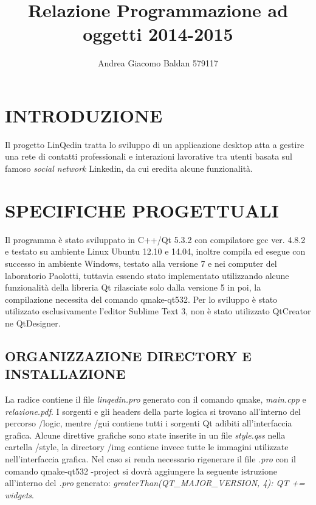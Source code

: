 \documentclass[11pt,a4paper]{article}
\title{Relazione Programmazione ad oggetti 2014-2015}
\author{Andrea Giacomo Baldan 579117}
\begin{document}
\maketitle
\begingroup
\let\clearpage\relax
\section*{INTRODUZIONE}
Il progetto LinQedin tratta lo sviluppo di un applicazione desktop atta a gestire una rete di contatti professionali e interazioni lavorative tra utenti
basata sul famoso \textit{social network} Linkedin\textcopyright, da cui eredita alcune funzionalità.
\section*{SPECIFICHE PROGETTUALI}
Il programma è stato sviluppato in C++/Qt 5.3.2 con compilatore gcc ver. 4.8.2 e testato su ambiente Linux Ubuntu 12.10 e 14.04, inoltre compila ed esegue con successo in ambiente Windows, testato
alla versione 7 e nei computer del laboratorio Paolotti, tuttavia essendo stato implementato utilizzando alcune funzionalità della libreria Qt rilasciate solo dalla versione 5 in poi,
la compilazione necessita del comando qmake-qt532.
Per lo sviluppo è stato utilizzato esclusivamente l'editor Sublime Text 3, non è stato utilizzato QtCreator ne QtDesigner.
\subsection*{ORGANIZZAZIONE DIRECTORY E INSTALLAZIONE}
La radice contiene il file \textit{linqedin.pro} generato con il comando qmake, \textit{main.cpp} e \textit{relazione.pdf}.
I sorgenti e gli headers della parte logica si trovano all'interno del percorso /logic, mentre /gui contiene tutti i sorgenti Qt adibiti all'interfaccia grafica.
Alcune direttive grafiche sono state inserite in un file \textit{style.qss} nella cartella /style, la directory /img contiene invece tutte le immagini utilizzate nell'interfaccia grafica.
Nel caso si renda necessario rigenerare il file \textit{.pro} con il comando qmake-qt532 -project si dovrà aggiungere la seguente istruzione all'interno del \textit{.pro} generato: \textit{greaterThan(QT\_MAJOR\_VERSION, 4): QT += widgets}.





\endgroup
\end{document}
